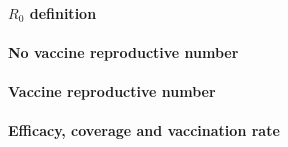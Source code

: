 \paragraph{$R_0$ definition}
\paragraph{No  vaccine reproductive number}
\paragraph{Vaccine reproductive number}
\paragraph{Efficacy, coverage and vaccination rate}